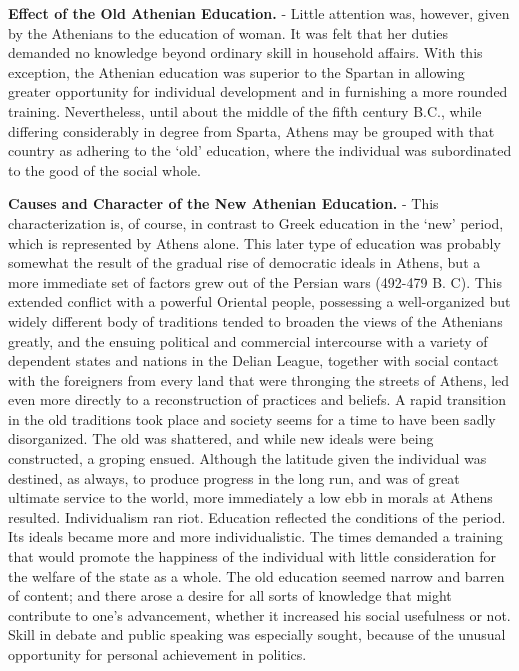 \documentclass[
]{book}
\begin{document}
\textbf{Effect of the Old Athenian Education.} - Little attention was, however, given by the Athenians to the education of woman. It was felt that her duties demanded no knowledge beyond ordinary skill in household affairs. With this exception, the Athenian education was superior to the Spartan in allowing greater opportunity for individual development and in furnishing a more rounded training. Nevertheless, until about the middle of the fifth century B.C., while differing considerably in degree from Sparta, Athens may be grouped with that country as adhering to the `old' education, where the individual was subordinated to the good of the social whole.

\textbf{Causes and Character of the New Athenian Education.} - This characterization is, of course, in contrast to Greek education in the `new' period, which is represented by Athens alone. This later type of education was probably somewhat the result of the gradual rise of democratic ideals in Athens, but a more immediate set of factors grew out of the Persian wars (492-479 B. C). This extended conflict with a powerful Oriental people, possessing a well-organized but widely different body of traditions tended to broaden the views of the Athenians greatly, and the ensuing political and commercial intercourse with a variety of dependent states and nations in the Delian League, together with social contact with the foreigners from every land that were thronging the streets of Athens, led even more directly to a reconstruction of practices and beliefs. A rapid transition in the old traditions took place and society seems for a time to have been sadly disorganized. The old was shattered, and while new ideals were being constructed, a groping ensued. Although the latitude given the individual was destined, as always, to produce progress in the long run, and was of great ultimate service to the world, more immediately a low ebb in morals at Athens resulted. Individualism ran riot. Education reflected the conditions of the period. Its ideals became more and more individualistic. The times demanded a training that would promote the happiness of the individual with little consideration for the welfare of the state as a whole. The old education seemed narrow and barren of content; and there arose a desire for all sorts of knowledge that might contribute to one's advancement, whether it increased his social usefulness or not. Skill in debate and public speaking was especially sought, because of the unusual opportunity for personal achievement in politics.
\end{document}
